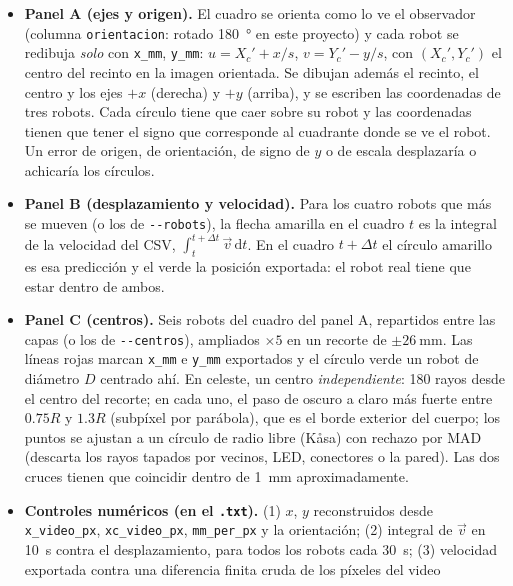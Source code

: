 \begin{itemize}
  \item \textbf{Panel A (ejes y origen).} El cuadro se orienta como lo ve el observador (columna
        \texttt{orientacion}: rotado \SI{180}{\degree} en este proyecto) y cada robot se redibuja \emph{solo}
        con \texttt{x\_mm}, \texttt{y\_mm}: $u = X_c' + x/s$, $v = Y_c' - y/s$, con $(X_c', Y_c')$ el centro
        del recinto en la imagen orientada. Se dibujan además el recinto, el centro y los ejes $+x$
        (derecha) y $+y$ (arriba), y se escriben las coordenadas de tres robots. Cada círculo tiene que
        caer sobre su robot y las coordenadas tienen que tener el signo que corresponde al cuadrante donde
        se ve el robot. Un error de origen, de orientación, de signo de $y$ o de escala desplazaría o achicaría
        los círculos.
  \item \textbf{Panel B (desplazamiento y velocidad).} Para los cuatro robots que más se mueven (o los de
        \texttt{-{}-robots}), la flecha amarilla en el cuadro $t$ es la integral de la velocidad del CSV,
        $\int_t^{t+\Delta t}\vec v\,\mathrm{d}t$. En el cuadro $t+\Delta t$ el círculo amarillo es esa
        predicción y el verde la posición exportada: el robot real tiene que estar dentro de ambos.
  \item \textbf{Panel C (centros).} Seis robots del cuadro del panel A, repartidos entre las capas (o los
        de \texttt{-{}-centros}), ampliados $\times 5$ en un recorte de $\pm\SI{26}{\milli\metre}$. Las líneas rojas
        marcan \texttt{x\_mm} e \texttt{y\_mm} exportados y el círculo verde un robot de diámetro $D$
        centrado ahí. En celeste, un centro \emph{independiente}: 180 rayos desde el centro del recorte; en
        cada uno, el paso de oscuro a claro más fuerte entre $0.75R$ y $1.3R$ (subpíxel por parábola), que
        es el borde exterior del cuerpo; los puntos se ajustan a un círculo de radio libre (Kåsa) con
        rechazo por MAD (descarta los rayos tapados por vecinos, LED, conectores o la pared). Las dos
        cruces tienen que coincidir dentro de \SI{1}{\milli\metre} aproximadamente.
  \item \textbf{Controles numéricos (en el \texttt{.txt}).} (1) $x$, $y$ reconstruidos desde
        \texttt{x\_video\_px}, \texttt{xc\_video\_px}, \texttt{mm\_per\_px} y la orientación; (2) integral de
        $\vec v$ en \SI{10}{\second} contra el desplazamiento, para todos los robots cada \SI{30}{\second};
        (3) velocidad exportada contra una diferencia finita cruda de los píxeles del video

\end{itemize}
